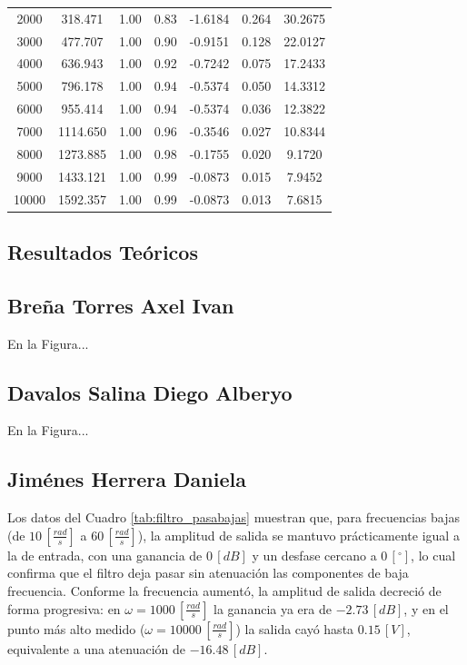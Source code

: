 \documentclass{article}
\newcommand{\EstudianteA}{Breña Torres Axel Ivan}
\newcommand{\EstudianteB}{Davalos Salina Diego Alberyo}
\newcommand{\EstudianteC}{Jiménes Herrera Daniela}
\begin{document}
\begin{table}[H]
\begin{tabular}{ccccccc}
2000  &  318.471 & 1.00 & 0.83 &  -1.6184 &   0.264 & 30.2675 \\
3000  &  477.707 & 1.00 & 0.90 &  -0.9151 &   0.128 & 22.0127 \\
4000  &  636.943 & 1.00 & 0.92 &  -0.7242 &   0.075 & 17.2433 \\
5000  &  796.178 & 1.00 & 0.94 &  -0.5374 &   0.050 & 14.3312 \\
6000  &  955.414 & 1.00 & 0.94 &  -0.5374 &   0.036 & 12.3822 \\
7000  & 1114.650 & 1.00 & 0.96 &  -0.3546 &   0.027 & 10.8344 \\
8000  & 1273.885 & 1.00 & 0.98 &  -0.1755 &   0.020 &  9.1720 \\
9000  & 1433.121 & 1.00 & 0.99 &  -0.0873 &   0.015 &  7.9452 \\
10000 & 1592.357 & 1.00 & 0.99 &  -0.0873 &   0.013 &  7.6815 \\
\bottomrule
\end{tabular}
\end{table}


\subsection{Resultados Teóricos}

\subsection{\EstudianteA}
En la Figura...

\subsection{\EstudianteB}
En la Figura...

\subsection{\EstudianteC}
Los datos del Cuadro \ref{tab:filtro_pasabajas} muestran que, para frecuencias bajas (de $10\,[\frac{rad}{s}]$ a $60\,[\frac{rad}{s}]$), la amplitud de salida se mantuvo prácticamente igual a la de entrada, con una ganancia de $0\,[dB]$ y un desfase cercano a $0\,[^ \circ]$, lo cual confirma que el filtro deja pasar sin atenuación las componentes de baja frecuencia. Conforme la frecuencia aumentó, la amplitud de salida decreció de forma progresiva: en $\omega=1000\,[\frac{rad}{s}]$ la ganancia ya era de $-2.73\,[dB]$, y en el punto más alto medido ($\omega=10000\,[\frac{rad}{s}]$) la salida cayó hasta $0.15\,[V]$, equivalente a una atenuación de $-16.48\,[dB]$. 
\end{document}
